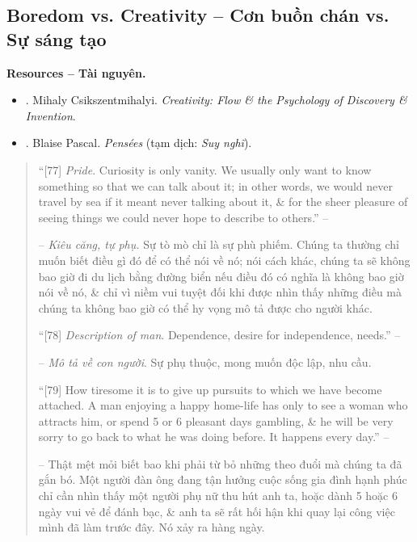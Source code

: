 \documentclass[12pt]{article}
\begin{document}

\subsection{Boredom vs. Creativity -- Cơn buồn chán  vs. Sự sáng tạo}
\textbf{\textsf{Resources -- Tài nguyên.}}
\begin{itemize}
	\item \cite{Csikszentmihalyi_creativity}. {\sc Mihaly Csikszentmihalyi}. {\it Creativity: Flow \& the Psychology of Discovery \& Invention}.
	\item \cite{Pascal_pensees}. {\sc Blaise Pascal}. {\it Pens\'ees} (tạm dịch: {\it Suy nghĩ}).
\end{itemize}

\begin{quote}
	``[77] {\it Pride}. Curiosity is only vanity. We usually only want to know something so that we can talk about it; in other words, we would never travel by sea if it meant never talking about it, \& for the sheer pleasure of seeing things we could never hope to describe to others.'' -- \cite[IV. Boredom]{Pascal_pensees}
	
	-- {\it Kiêu căng, tự phụ.} Sự tò mò chỉ là sự phù phiếm. Chúng ta thường chỉ muốn biết điều gì đó để có thể nói về nó; nói cách khác, chúng ta sẽ không bao giờ đi du lịch bằng đường biển nếu điều đó có nghĩa là không bao giờ nói về nó, \& chỉ vì niềm vui tuyệt đối khi được nhìn thấy những điều mà chúng ta không bao giờ có thể hy vọng mô tả được cho người khác.
	
	``[78] {\it Description of man}. Dependence, desire for independence, needs.'' -- \cite[IV. Boredom]{Pascal_pensees}
	
	-- {\it Mô tả về con người}. Sự phụ thuộc, mong muốn độc lập, nhu cầu.
		
	``[79] How tiresome it is to give up pursuits to which we have become attached. A man enjoying a happy home-life has only to see a woman who attracts him, or spend 5 or 6 pleasant days gambling, \& he will be very sorry to go back to what he was doing before. It happens every day.'' -- \cite[IV. Boredom]{Pascal_pensees}
	
	-- Thật mệt mỏi biết bao khi phải từ bỏ những theo đuổi mà chúng ta đã gắn bó. Một người đàn ông đang tận hưởng cuộc sống gia đình hạnh phúc chỉ cần nhìn thấy một người phụ nữ thu hút anh ta, hoặc dành 5 hoặc 6 ngày vui vẻ để đánh bạc, \& anh ta sẽ rất hối hận khi quay lại công việc mình đã làm trước đây. Nó xảy ra hàng ngày.
\end{quote}
\end{document}

